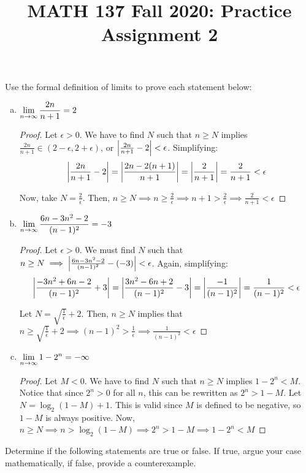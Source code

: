 \documentclass[11pt]{article}
\title{MATH 137 Fall 2020: Practice Assignment 2}
\begin{document}
\parindent=0pt
\thispagestyle{firstpage}

\textbf{\@title}

\question Use the formal definition of limits to prove each statement below:

\begin{enumerate}[(a)]

  \item $\displaystyle\lim_{n\to\infty}\frac{2n}{n+1}=2$
        \begin{proof}
          Let $\epsilon>0$.
          We have to find $N$ such that $n\geq N$ implies $\frac{2n}{n+1}\in(2-\epsilon,2+\epsilon)$, or $\abs{\frac{2n}{n+1}-2}<\epsilon$.
          Simplifying:
          \[ \abs{\frac{2n}{n+1}-2} = \abs{\frac{2n-2(n+1)}{n+1}} = \abs{\frac{2}{n+1}} = \frac{2}{n+1} < \epsilon \]

          Now, take $N=\frac2\epsilon$.
          Then, $n\geq N\implies n\geq\frac2\epsilon\implies n+1>\frac2\epsilon\implies\frac2{n+1}<\epsilon$
        \end{proof}

  \item $\displaystyle\lim_{n\to\infty}\frac{6n-3n^2-2}{(n-1)^2}=-3$
        \begin{proof}
          Let $\epsilon>0$. We must find $N$ such that $n\geq N\implies \abs{\frac{6n-3n^2-2}{(n-1)^2}-(-3)}<\epsilon$. Again, simplifying:
          \[ \abs{\frac{-3n^2+6n-2}{(n-1)^2}+3} = \abs{\frac{3n^2-6n+2}{(n-1)^2}-3} = \abs{\frac{-1}{(n-1)^2}}= \frac{1}{(n-1)^2} < \epsilon \]

          Let $N=\sqrt{\frac1\epsilon}+2$. Then, $n\geq N$ implies that $n\geq\sqrt{\frac1\epsilon}+2 \implies (n-1)^2>\frac1\epsilon\implies\frac{1}{(n-1)^2}<\epsilon$
        \end{proof}

  \item $\displaystyle\lim_{n\to\infty}1-2^n=-\infty$
        \begin{proof}
          Let $M<0$. We have to find $N$ such that $n\geq N$ implies $1-2^n<M$. Notice that since $2^n>0$ for all $n$, this can be rewritten as $2^n>1-M$. Let $N=\log_2(1-M)+1$. This is valid since $M$ is defined to be negative, so $1-M$ is always positive. Now, $n\geq N\implies n>\log_2(1-M)\implies 2^n>1-M\implies1-2^n<M$
        \end{proof}

\end{enumerate}



\question Determine if the following statements are true or false.
If true, argue your case mathematically, if false, provide a counterexample.
\end{document}
